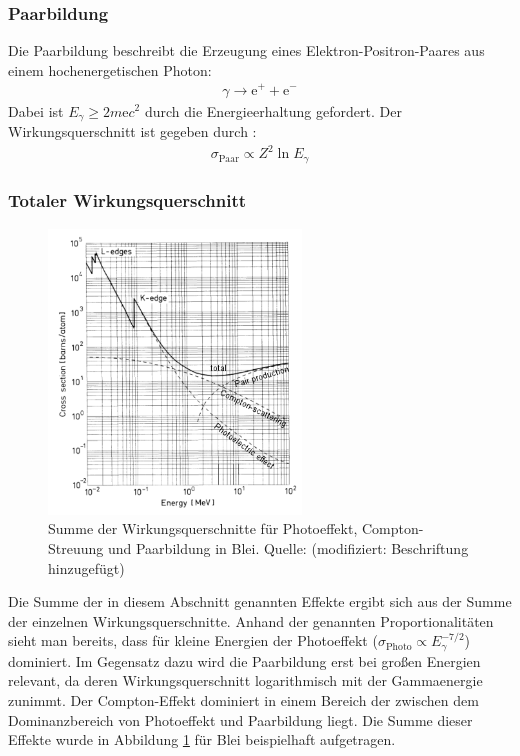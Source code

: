 \documentclass[11pt, a4paper]{article}
\numberwithin{equation}{section}
\begin{document}
\subsubsection{Paarbildung}
Die Paarbildung beschreibt die Erzeugung eines Elektron-Positron-Paares aus einem hochenergetischen Photon:
\begin{align}
	\gamma \rightarrow \mathrm{e}^{+} + \mathrm{e}^{-}
\end{align}
Dabei ist $E_\gamma \geq 2 m\mathrm{e} c^2$ durch die Energieerhaltung gefordert.
Der Wirkungsquerschnitt ist gegeben durch \cite{wermes}:
\begin{align}
	\sigma_\mathrm{Paar} \propto Z^2 \ln E_\gamma
\end{align}

\subsubsection{Totaler Wirkungsquerschnitt}
\begin{figure}
	\centering
	\includegraphics[width=0.6\textwidth]{./figures/photocrosssection.png}
	\caption{Summe der Wirkungsquerschnitte für Photoeffekt, Compton-Streuung und Paarbildung in Blei. Quelle: \cite{leo} (modifiziert: Beschriftung hinzugefügt)}
	\label{fig:photo_total}
\end{figure}
Die Summe der in diesem Abschnitt genannten Effekte ergibt sich aus der Summe der einzelnen Wirkungsquerschnitte.
Anhand der genannten Proportionalitäten sieht man bereits, dass für kleine Energien der Photoeffekt ($\sigma_\mathrm{Photo}\propto E_\gamma^{-7/2}$) dominiert.
Im Gegensatz dazu wird die Paarbildung erst bei großen Energien relevant, da deren Wirkungsquerschnitt logarithmisch mit der Gammaenergie zunimmt.
Der Compton-Effekt dominiert in einem Bereich der zwischen dem Dominanzbereich von Photoeffekt und Paarbildung liegt.
Die Summe dieser Effekte wurde in Abbildung \ref{fig:photo_total} für Blei beispielhaft aufgetragen.
\end{document}
